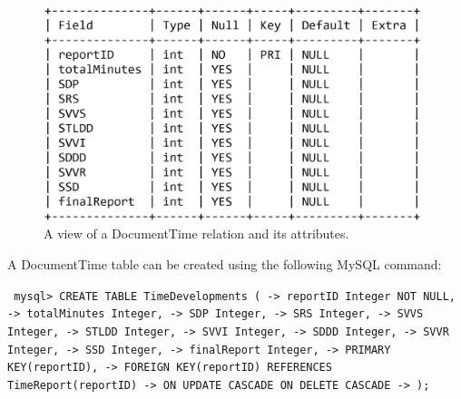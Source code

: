 \documentclass{article}
\begin{document}
\begin{figure}[H]
     \centering
     \includegraphics[width=11cm]{images/SQL_tables/documenttime.png}
     \renewcommand\figurename{Figure}
     \caption{A view of a DocumentTime relation and its attributes.}
     \label{fig:my_label}
 \end{figure}
\newline

A DocumentTime table can be created using the following MySQL command:
\newline

\small
\texttt{
\noindent mysql> CREATE TABLE TimeDevelopments (\newline
\indent\indent\indent -> reportID Integer NOT NULL,\newline
\indent\indent\indent -> totalMinutes Integer,\newline
\indent\indent\indent -> SDP Integer,\newline
\indent\indent\indent -> SRS Integer,\newline
\indent\indent\indent -> SVVS Integer,\newline
\indent\indent\indent -> STLDD Integer,\newline
\indent\indent\indent -> SVVI Integer,\newline
\indent\indent\indent -> SDDD Integer,\newline
\indent\indent\indent -> SVVR Integer,\newline
\indent\indent\indent -> SSD Integer,\newline
\indent\indent\indent -> finalReport Integer,\newline
\indent\indent\indent -> PRIMARY KEY(reportID),\newline
\indent\indent\indent -> FOREIGN KEY(reportID) REFERENCES TimeReport(reportID)\newline
\indent\indent\indent -> ON UPDATE CASCADE ON DELETE CASCADE\newline
\indent\indent\indent -> );\newline
}
\normalsize
\end{document}
